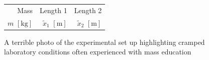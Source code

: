 \documentclass[a4paper]{article}
\begin{document}
\begin{figure}[h]
	\begin{minipage}{0.45\textwidth}
		\centering
		\caption{A terrible photo of the experimental set up highlighting cramped laboratory conditions often experienced with mass education}
	\end{minipage}
	\hspace{1cm}
	\begin{minipage}{0.45\textwidth}
			\centering
			\begin{tabular}{rrr}
				\toprule
				Mass & Length 1 & Length 2\\
				$m$ $[\si{\kilogram}]$ & $\tilde{x}_1$ $[\si{\meter}]$ & $\tilde{x}_2$ $[\si{\meter}]$ \\

\end{tabular}
\end{minipage}
\end{figure}
\end{document}
